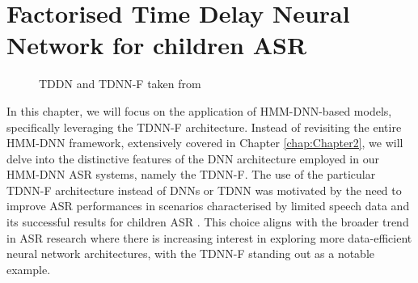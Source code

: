 \section{Factorised Time Delay Neural Network for children ASR}
\label{sec:TDNNF}
\begin{figure}[ht]
    \centering
    \caption{TDDN and TDNN-F taken from \cite{tdnnf-children}}
\end{figure}
In this chapter, we will focus on the application of \ac{HMM-DNN}-based models, specifically leveraging the \ac{TDNN-F} architecture.  Instead of revisiting the entire \ac{HMM-DNN} framework, extensively covered in Chapter \ref{chap:Chapter2}, we will delve into the distinctive features of the \ac{DNN} architecture employed in our \ac{HMM-DNN} \ac{ASR} systems, namely the \ac{TDNN-F}. 
The use of the particular \ac{TDNN-F} architecture instead of \acp{DNN} or \ac{TDNN} was motivated by the need to improve \ac{ASR} performances in scenarios characterised by limited speech data and its successful results for children \ac{ASR} \cite{tdnnf-children}. This choice aligns with the broader trend in \ac{ASR} research where there is increasing interest in exploring more data-efficient neural network architectures, with the \ac{TDNN-F} standing out as a notable example.

